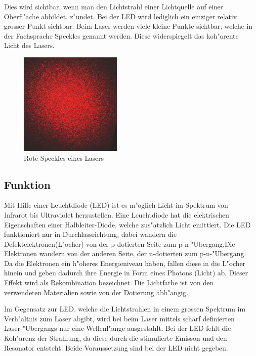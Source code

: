 \begin{refsection}
Dies wird sichtbar, wenn man den Lichtstrahl einer Lichtquelle
auf einer Oberfl"ache abbildet.
z"undet. Bei der LED wird lediglich ein einziger relativ grosser Punkt 
sichtbar. Beim Laser werden viele kleine Punkte sichtbar, welche in der
Fachsprache Speckles genannt werden. Diese widerspiegelt das koh"arente Licht
des Lasers.

\begin{figure}
\centering
\includegraphics[width = 5cm]{laser/bilder/Objective_speckle.jpg}
\caption{Rote Speckles eines Lasers \cite{WikiSpeckle}}
\end{figure}

\subsection{Funktion}
Mit Hilfe einer Leuchtdiode (LED) ist es m"oglich Licht im Spektrum von 
Infrarot bis Ultraviolet herzustellen. Eine Leuchtdiode hat die elektrischen 
Eigenschaften einer Halbleiter-Diode, welche zus"atzlich Licht emittiert. Die 
LED funktioniert nur in Durchlassrichtung, dabei wandern die 
Defektelektronen(L"ocher) von der p-dotierten Seite zum p-n-"Ubergang.Die 
Elektronen wandern von der anderen Seite, der n-dotierten zum p-n-"Ubergang. 
Da die Elektronen ein h"oheres Energieniveau haben, fallen diese in die 
L"ocher hinein und geben dadurch ihre Energie in Form eines Photons (Licht) 
ab. Dieser Effekt wird als Rekombination bezeichnet. Die Lichtfarbe ist von 
den verwendeten Materialien sowie von der Dotierung abh"angig.

Im Gegensatz zur LED, welche die Lichtstrahlen in einem grossen Spektrum im 
Verh"altnis zum Laser abgibt, wird bei beim Laser mittels scharf definierten 
Laser-"Ubergangs nur eine Wellenl"ange ausgestahlt.  
Bei der LED fehlt die Koh"arenz der Strahlung, da 
diese durch die stimulierte Emisson und den Resonator entsteht. Beide 
Voraussetzung sind bei der LED nicht gegeben. 


\end{refsection}
